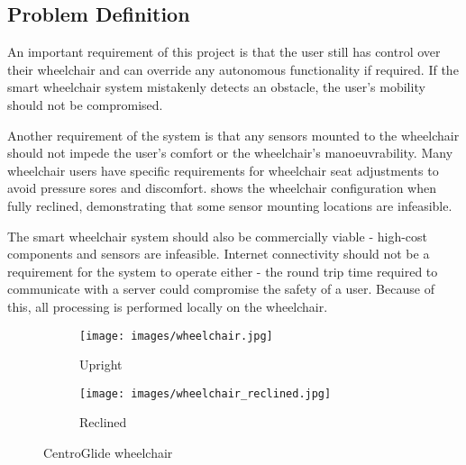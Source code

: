 \pagebreak
\subsection{Problem Definition}
An important requirement of this project is that the user still
has control over their wheelchair and can override any autonomous functionality
if required. If the smart wheelchair system mistakenly detects an obstacle,
the user's mobility should not be compromised.

Another requirement of the system is that any sensors mounted to the wheelchair
should not impede the user's comfort or the wheelchair's manoeuvrability.
Many wheelchair users have specific requirements for wheelchair seat adjustments
to avoid pressure sores and discomfort.  shows the
wheelchair configuration when fully reclined, demonstrating that some sensor mounting locations
are infeasible.

The smart wheelchair system should also be commercially viable - high-cost
components and sensors are infeasible. Internet connectivity should not be a requirement
for the system to operate either - the round trip time required to communicate with a server
could compromise the safety of a user. Because of this, all processing is performed locally
on the wheelchair.

\begin{figure}[b]
    \centering
    \begin{subfigure}{.45\textwidth}
        \centering
        \texttt{[image: images/wheelchair.jpg]}
        \caption{Upright}
    \end{subfigure}
    \quad
    \begin{subfigure}{.45\textwidth}
        \centering
        \texttt{[image: images/wheelchair\_reclined.jpg]}
        \caption{Reclined}
    \end{subfigure}
    \caption{CentroGlide wheelchair}
    \label{fig:wheelchair}
\end{figure}
